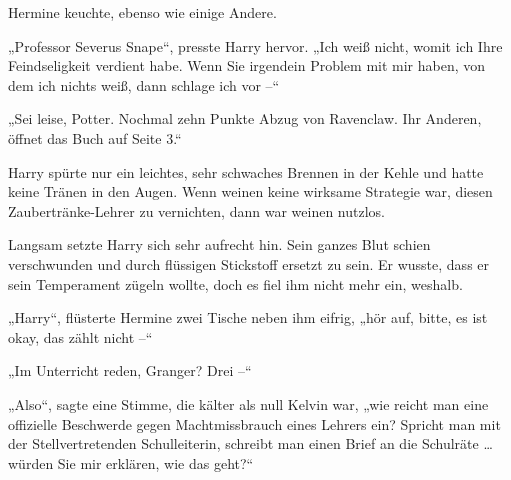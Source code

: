 Hermine keuchte, ebenso wie einige Andere. 

„Professor Severus Snape“, presste Harry hervor. „Ich weiß nicht, womit ich Ihre Feindseligkeit verdient habe. Wenn Sie irgendein Problem mit mir haben, von dem ich nichts weiß, dann schlage ich vor –“ 

„Sei leise, Potter. Nochmal zehn Punkte Abzug von Ravenclaw. Ihr Anderen, öffnet das Buch auf Seite 3.“ 

Harry spürte nur ein leichtes, sehr schwaches Brennen in der Kehle und hatte keine Tränen in den Augen. Wenn weinen keine wirksame Strategie war, diesen Zaubertränke-Lehrer zu vernichten, dann war weinen nutzlos. 

Langsam setzte Harry sich sehr aufrecht hin. Sein ganzes Blut schien verschwunden und durch flüssigen Stickstoff ersetzt zu sein. Er wusste, dass er sein Temperament zügeln wollte, doch es fiel ihm nicht mehr ein, weshalb. 

„Harry“, flüsterte Hermine zwei Tische neben ihm eifrig, „hör auf, bitte, es ist okay, das zählt nicht –“ 

„Im Unterricht reden, Granger? Drei –“ 

„Also“, sagte eine Stimme, die kälter als null Kelvin war, „wie reicht man eine offizielle Beschwerde gegen Machtmissbrauch eines Lehrers ein? Spricht man mit der Stellvertretenden Schulleiterin, schreibt man einen Brief an die Schulräte … würden Sie mir erklären, wie das geht?“ 

